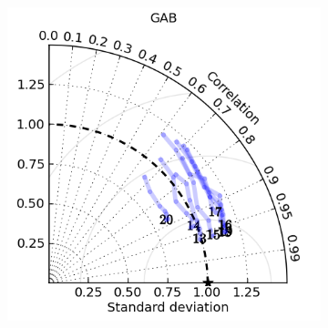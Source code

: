 \begin{figure}[!hbt]
\begin{subfigure}{0.30\textwidth}
        \caption{}
    \end{subfigure}
    \begin{subfigure}{0.30\textwidth}
        \includegraphics[width=\textwidth]{figures/plots/taylor_diag_res_GAB.png}
        \caption{}
    \end{subfigure}
    \begin{subfigure}{0.30\textwidth}


\end{subfigure}
\end{figure}
